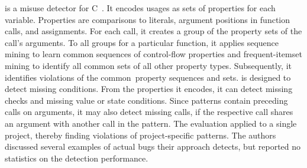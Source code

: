 \RGJ is a misuse detector for C~\cite{RGJ07}.
It encodes usages as sets of properties for each variable. %
Properties are
comparisons to literals,
argument positions in function calls,
and assignments.
For each call, it creates a group of the property sets of the call's arguments.
To all groups for a particular function, it applies sequence mining to learn common sequences of control-flow properties and frequent-itemset mining to identify all common sets of all other property types.
Subsequently, it identifies violations of the common~property sequences and sets.
\RGJ is designed to detect missing conditions.
From the properties it encodes, it can detect missing  checks and missing value or state conditions.
Since patterns contain preceding calls on arguments, it may also detect missing calls, if the respective call shares an argument with another call in the pattern.
The evaluation applied \RGJ to a single project, thereby finding violations of project-specific patterns.
The authors discussed several examples of actual bugs their approach detects, but reported no statistics on the detection performance.

\vspace{0.03in}

